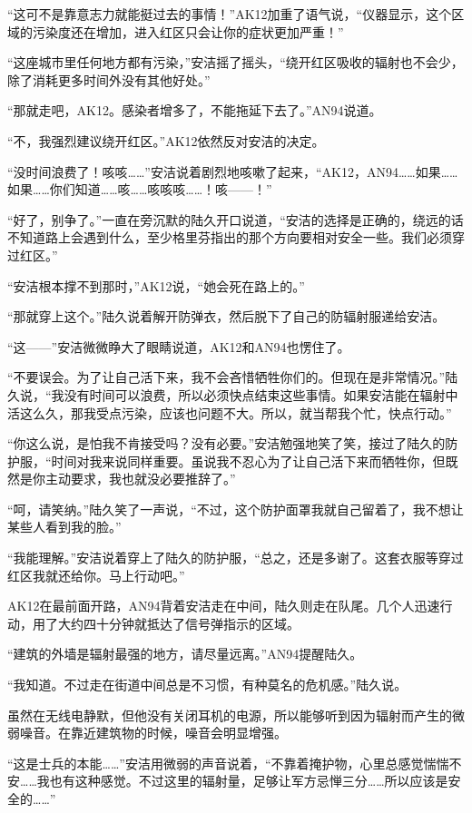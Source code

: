 “这可不是靠意志力就能挺过去的事情！”AK12加重了语气说，“仪器显示，这个区域的污染度还在增加，进入红区只会让你的症状更加严重！”

“这座城市里任何地方都有污染，”安洁摇了摇头，“绕开红区吸收的辐射也不会少，除了消耗更多时间外没有其他好处。”

“那就走吧，AK12。感染者增多了，不能拖延下去了。”AN94说道。

“不，我强烈建议绕开红区。”AK12依然反对安洁的决定。

“没时间浪费了！咳咳……”安洁说着剧烈地咳嗽了起来，“AK12，AN94……如果……如果……你们知道……咳……咳咳咳……！咳——！”

“好了，别争了。”一直在旁沉默的陆久开口说道，“安洁的选择是正确的，绕远的话不知道路上会遇到什么，至少格里芬指出的那个方向要相对安全一些。我们必须穿过红区。”

“安洁根本撑不到那时，”AK12说，“她会死在路上的。”

“那就穿上这个。”陆久说着解开防弹衣，然后脱下了自己的防辐射服递给安洁。

“这——”安洁微微睁大了眼睛说道，AK12和AN94也愣住了。

“不要误会。为了让自己活下来，我不会吝惜牺牲你们的。但现在是非常情况。”陆久说，“我没有时间可以浪费，所以必须快点结束这些事情。如果安洁能在辐射中活这么久，那我受点污染，应该也问题不大。所以，就当帮我个忙，快点行动。”

“你这么说，是怕我不肯接受吗？没有必要。”安洁勉强地笑了笑，接过了陆久的防护服，“时间对我来说同样重要。虽说我不忍心为了让自己活下来而牺牲你，但既然是你主动要求，我也就没必要推辞了。”

“呵，请笑纳。”陆久笑了一声说，“不过，这个防护面罩我就自己留着了，我不想让某些人看到我的脸。”

“我能理解。”安洁说着穿上了陆久的防护服，“总之，还是多谢了。这套衣服等穿过红区我就还给你。马上行动吧。”

AK12在最前面开路，AN94背着安洁走在中间，陆久则走在队尾。几个人迅速行动，用了大约四十分钟就抵达了信号弹指示的区域。

“建筑的外墙是辐射最强的地方，请尽量远离。”AN94提醒陆久。

“我知道。不过走在街道中间总是不习惯，有种莫名的危机感。”陆久说。

虽然在无线电静默，但他没有关闭耳机的电源，所以能够听到因为辐射而产生的微弱噪音。在靠近建筑物的时候，噪音会明显增强。

“这是士兵的本能……”安洁用微弱的声音说着，“不靠着掩护物，心里总感觉惴惴不安……我也有这种感觉。不过这里的辐射量，足够让军方忌惮三分……所以应该是安全的……”

